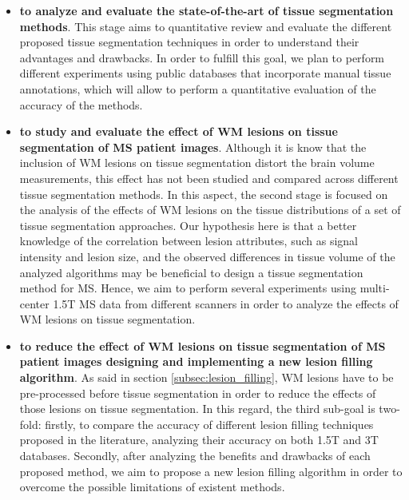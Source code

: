 \begin{itemize}

\item \textbf{to analyze and evaluate the state-of-the-art of tissue segmentation methods}. This stage aims to quantitative review and evaluate the different proposed tissue segmentation techniques in order to understand their advantages and drawbacks. In order to fulfill this goal, we plan to perform different experiments using public databases that incorporate manual tissue annotations, which will allow to perform a quantitative evaluation of the accuracy of the methods. 
  
\item \textbf{to study and evaluate the effect of WM lesions on tissue segmentation of MS patient images}. Although it is know that the inclusion of WM lesions on tissue segmentation distort the brain volume measurements, this effect has not been studied and compared across different tissue segmentation methods. In this aspect, the second stage is focused on the analysis of the effects of WM lesions on the tissue distributions of a set of tissue segmentation approaches. Our hypothesis here is that a better knowledge of the correlation between lesion attributes, such as signal intensity and lesion size, and the observed differences in tissue volume of the analyzed algorithms may be beneficial to design a tissue segmentation method for MS. Hence, we aim to perform several experiments using multi-center 1.5T MS data from different scanners in order to analyze the effects of WM lesions on tissue segmentation.

\item \textbf{to reduce the effect of WM lesions on tissue segmentation of MS patient images designing and implementing a new lesion filling algorithm}. As said in section \ref{subsec:lesion_filling}, WM lesions have to be pre-processed before tissue segmentation in order to reduce the effects of those lesions on tissue segmentation. In this regard, the third sub-goal is two-fold: firstly, to compare the accuracy of different lesion filling techniques proposed in the literature, analyzing their accuracy on both 1.5T and 3T databases. Secondly, after analyzing the benefits and drawbacks of each proposed method, we aim to propose a new lesion filling algorithm in order to overcome the possible limitations of existent methods.


\end{itemize}
